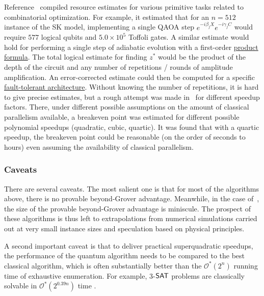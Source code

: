 \begin{refsection}
Reference~\cite{sanders2020FTQCforCombOpt} compiled resource estimates for various primitive tasks related to combinatorial optimization. For example, it estimated that for an $n=512$ instance of the SK model, implementing a single QAOA step $e^{-i\beta_j X}e^{-i\gamma_j C}$ would require $577$ logical qubits and  $5.0 \times 10^5$ Toffoli gates. A similar estimate would hold for performing a single step of adiabatic evolution with a first-order \hyperref[prim:ProductFormulae]{product formula}. The total logical estimate for finding $z^*$ would be the product of the depth of the circuit and any number of repetitions / rounds of amplitude amplification. An error-corrected estimate could then be computed for a specific \hyperref[prim:FTQC]{fault-tolerant architecture}. Without knowing the number of repetitions, it is hard to give precise estimates, but a rough attempt was made in~\cite{babbush2021FocusBeyondQuadratic} for different speedup factors. There, under different possible assumptions on the amount of classical parallelism available, a breakeven point was estimated for different possible polynomial speedups (quadratic, cubic, quartic). It was found that with a quartic speedup, the breakeven point could be reasonable (on the order of seconds to hours) even assuming the availability of classical parallelism.   


\subsubsection*{Caveats}

There are several caveats. The most salient one is that for most of the algorithms above, there is no provable beyond-Grover advantage. Meanwhile, in the case of~\cite{dalzell2022mindthegap}, the size of the provable beyond-Grover advantage is miniscule. The prospect of these algorithms is thus left to extrapolations from numerical simulations carried out at very small instance sizes and speculation based on physical principles. 



A second important caveat is that to deliver practical superquadratic speedups, the performance of the quantum algorithm needs to be compared to the best classical algorithm, which is often substantially better than the $\mathcal{O}^*(2^n)$ running time of exhaustive enumeration.  For example, $3$-$\mathsf{SAT}$ problems are classically solvable in $\mathcal{O}^*(2^{0.39n})$ time \cite{dueholm2019fasterKSAT}. 


\end{refsection}

